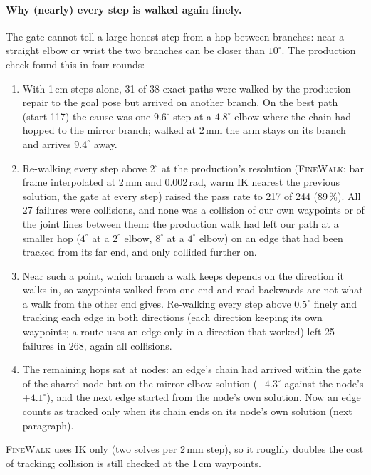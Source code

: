 \documentclass[11pt,a4paper]{article}
\newcommand{\fn}[1]{\textsc{#1}}
\begin{document}
\paragraph{Why (nearly) every step is walked again finely.} The gate cannot tell
a large honest step from a hop between branches: near a straight elbow or wrist
the two branches can be closer than $10^\circ$. The production check found this
in four rounds:
\begin{enumerate}[nosep]
  \item With 1\,cm steps alone, 31 of 38 exact paths were walked by the production
        repair to the goal pose but arrived on another branch. On the best path
        (start 117) the cause was one $9.6^\circ$ step at a $4.8^\circ$ elbow where
        the chain had hopped to the mirror branch; walked at 2\,mm the arm stays on
        its branch and arrives $9.4^\circ$ away.
  \item Re-walking every step above $2^\circ$ at the production's resolution
        (\fn{FineWalk}: bar frame interpolated at 2\,mm and 0.002\,rad, warm IK
        nearest the previous solution, the gate at every step) raised the pass
        rate to 217 of 244 (89\,\%). All 27 failures were collisions, and none
        was a collision of our own waypoints or of the joint lines between them:
        the production walk had left our path at a smaller hop ($4^\circ$ at a
        $2^\circ$ elbow, $8^\circ$ at a $4^\circ$ elbow) on an edge that had been
        tracked from its far end, and only collided further on.
  \item Near such a point, which branch a walk keeps depends on the direction it
        walks in, so waypoints walked from one end and read backwards are not what
        a walk from the other end gives. Re-walking every step above $0.5^\circ$
        finely and tracking each edge in both directions (each direction keeping
        its own waypoints; a route uses an edge only in a direction that worked)
        left 25 failures in 268, again all collisions.
  \item The remaining hops sat at nodes: an edge's chain had arrived within the
        gate of the shared node but on the mirror elbow solution ($-4.3^\circ$
        against the node's $+4.1^\circ$), and the next edge started from the
        node's own solution. Now an edge counts as tracked only when its chain
        ends on its node's own solution (next paragraph).
\end{enumerate}
\fn{FineWalk} uses IK only (two solves per 2\,mm step), so it roughly doubles
the cost of tracking; collision is still checked at the 1\,cm waypoints.
\end{document}
